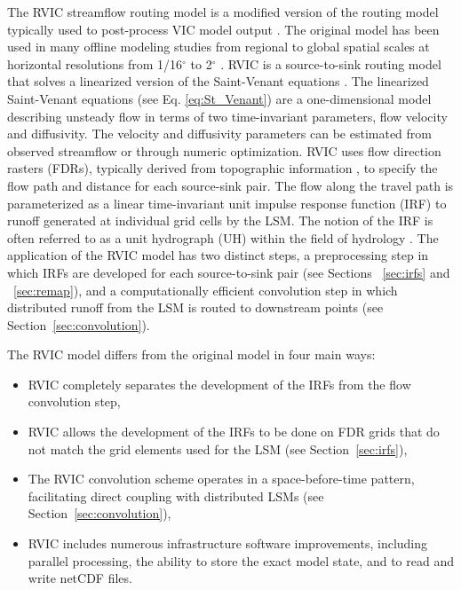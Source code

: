 \documentclass[jgrga, draft]{agutex}
\begin{document}
\begin{article}
The RVIC streamflow routing model is a modified version of the routing model typically used to post-process VIC model output \citep{Lohmann_1996, Lohmann_1998a}.
The original \citet{Lohmann_1996} model has been used in many offline modeling studies from regional to global spatial scales at horizontal resolutions from 1/16$^{\circ}$ to 2$^{\circ}$ \citep[e.g.][]{Nijssen_1997,Lohmann_1998b,Su_2005,Hamlet_2013}.
RVIC is a source-to-sink routing model that solves a linearized version of the Saint-Venant equations \citep{Fread_1992,Mesa_1986}.
The linearized Saint-Venant equations (see Eq. \ref{eq:St_Venant}) are a one-dimensional model describing unsteady flow in terms of two time-invariant parameters, flow velocity and diffusivity.
The velocity and diffusivity parameters can be estimated from observed streamflow or through numeric optimization.
RVIC uses flow direction rasters (FDRs), typically derived from topographic information \citep[e.g.][]{Wu_2011}, to specify the flow path and distance for each source-sink pair.
The flow along the travel path is parameterized as a linear time-invariant unit impulse response function (IRF) to runoff generated at individual grid cells by the LSM.
The notion of the IRF is often referred to as a unit hydrograph (UH) within the field of hydrology \citep[e.g.][]{Sherman_1932,Nash_1957}.
The application of the RVIC model has two distinct steps, a preprocessing step in which IRFs are developed for each source-to-sink pair (see Sections ~\ref{sec:irfs} and ~\ref{sec:remap}), and a computationally efficient convolution step in which distributed runoff from the LSM is routed to downstream points (see Section~\ref{sec:convolution}).

The RVIC model differs from the original \citet{Lohmann_1996} model in four main ways:

\begin{itemize}[leftmargin=+.5in]
\item RVIC completely separates the development of the IRFs from the flow convolution step,
\item RVIC allows the development of the IRFs to be done on FDR grids that do not match the grid elements used for the LSM (see Section~\ref{sec:irfs}),
\item The RVIC convolution scheme operates in a space-before-time pattern, facilitating direct coupling with distributed LSMs (see Section~\ref{sec:convolution}),
\item RVIC includes numerous infrastructure software improvements, including parallel processing, the ability to store the exact model state, and to read and write netCDF files.
\end{itemize}


\end{article}
\end{document}
